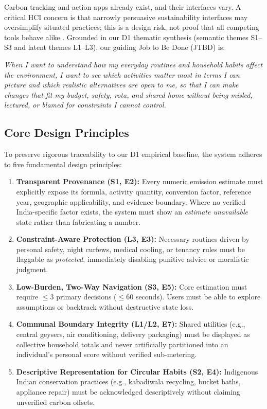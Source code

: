 \documentclass[12pt,a4paper]{article}
\begin{document}
Carbon tracking and action apps already exist, and their interfaces vary. A critical HCI concern is that narrowly persuasive sustainability interfaces may oversimplify situated practices; this is a design risk, not proof that all competing tools behave alike \cite{brynjarsdottir2012}. Grounded in our D1 thematic synthesis (semantic themes S1--S3 and latent themes L1--L3), our guiding Job to Be Done (JTBD) is:
\begin{jtbox}
\itshape
When I want to understand how my everyday routines and household habits affect the environment, I want to see which activities matter most in terms I can picture and which realistic alternatives are open to me, so that I can make changes that fit my budget, safety, rota, and shared home without being misled, lectured, or blamed for constraints I cannot control.
\end{jtbox}

\subsection{Core Design Principles}
To preserve rigorous traceability to our D1 empirical baseline, the system adheres to five fundamental design principles:
\begin{enumerate}[label=\textbf{\color{Teal}DP\arabic*.},leftmargin=*,itemsep=0.68em,topsep=0.5em]
  \item \textbf{Transparent Provenance (S1, E2):} Every numeric emission estimate must explicitly expose its formula, activity quantity, conversion factor, reference year, geographic applicability, and evidence boundary. Where no verified India-specific factor exists, the system must show an \emph{estimate unavailable} state rather than fabricating a number.
  \item \textbf{Constraint-Aware Protection (L3, E3):} Necessary routines driven by personal safety, night curfews, medical cooling, or tenancy rules must be flaggable as \emph{protected}, immediately disabling punitive advice or moralistic judgment.
  \item \textbf{Low-Burden, Two-Way Navigation (S3, E5):} Core estimation must require $\le 3$ primary decisions ($\le 60$ seconds). Users must be able to explore assumptions or backtrack without destructive state loss.
  \item \textbf{Communal Boundary Integrity (L1/L2, E7):} Shared utilities (e.g., central geysers, air conditioning, delivery packaging) must be displayed as collective household totals and never artificially partitioned into an individual's personal score without verified sub-metering.
  \item \textbf{Descriptive Representation for Circular Habits (S2, E4):} Indigenous Indian conservation practices (e.g., kabadiwala recycling, bucket baths, appliance repair) must be acknowledged descriptively without claiming unverified carbon offsets.
\end{enumerate}
\end{document}
